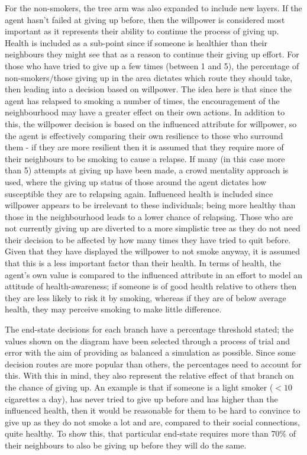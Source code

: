 \documentclass[]{report}
\begin{document}
For the non-smokers, the tree arm was also expanded to include new layers. If the agent hasn't failed at giving up before, then the willpower is considered most important as it represents their ability to continue the process of giving up. Health is included as a sub-point since if someone is healthier than their neighbours they might see that as a reason to continue their giving up effort. For those who have tried to give up a few times (between 1 and 5), the percentage of non-smokers/those giving up in the area dictates which route they should take, then leading into a decision based on willpower. The idea here is that since the agent has relapsed to smoking a number of times, the encouragement of the neighbourhood may have a greater effect on their own actions. In addition to this, the willpower decision is based on the influenced attribute for willpower, so the agent is effectively comparing their own resilience to those who surround them - if they are more resilient then it is assumed that they require more of their neighbours to be smoking to cause a relapse. If many (in this case more than 5) attempts at giving up have been made, a crowd mentality approach is used, where the giving up status of those around the agent dictates how susceptible they are to relapsing again. Influenced health is included since willpower appears to be irrelevant to these individuals; being more healthy than those in the neighbourhood leads to a lower chance of relapsing. Those who are not currently giving up are diverted to a more simplistic tree as they do not need their decision to be affected by how many times they have tried to quit before. Given that they have displayed the willpower to not smoke anyway, it is assumed that this is a less important factor than their health. In terms of health, the agent's own value is compared to the influenced attribute in an effort to model an attitude of health-awareness; if someone is of good health relative to others then they are less likely to risk it by smoking, whereas if they are of below average health, they may perceive smoking to make little difference.

The end-state decisions for each branch have a percentage threshold stated; the values shown on the diagram have been selected through a process of trial and error with the aim of providing as balanced a simulation as possible. Since some decision routes are more popular than others, the percentages need to account for this. With this in mind, they also represent the relative effect of that branch on the chance of giving up. An example is that if someone is a light smoker ($< 10$ cigarettes a day), has never tried to give up before and has higher than the influenced health, then it would be reasonable for them to be hard to convince to give up as they do not smoke a lot and are, compared to their social connections, quite healthy. To show this, that particular end-state requires more than 70\% of their neighbours to also be giving up before they will do the same.
\end{document}

